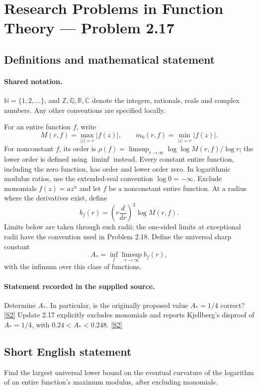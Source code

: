 \documentclass[11pt]{article}
\newcommand{\sref}[2]{\hyperlink{source:#1:#2}{[S#2]}}
\begin{document}
\section{Research Problems in Function Theory — Problem 2.17}\label{statement}

\subsection{Definitions and mathematical statement}

\paragraph{Shared notation.}$\mathbb N=\{1,2,\ldots\}$, and $\mathbb Z,\mathbb Q,\mathbb R,\mathbb C$ denote the integers, rationals, reals and complex numbers. Any other conventions are specified locally.


For an entire function $f$, write
\[
 M(r,f)=\max_{|z|=r}|f(z)|,\qquad m_0(r,f)=\min_{|z|=r}|f(z)|.
\]
For nonconstant $f$, its order is $\rho(f)=\limsup_{r\to\infty}\log\log M(r,f)/\log r$;
the lower order is defined using $\liminf$ instead. Every constant entire function, including the zero function, has order and lower order zero. In logarithmic modulus ratios, use the extended-real convention $\log0=-\infty$.
Exclude monomials $f(z)=az^n$ and let $f$ be a nonconstant entire function. At a radius where the derivatives exist, define
\[b_f(r)=\left(r\frac{d}{dr}\right)^2\log M(r,f).
\]
Limits below are taken through such radii; the one-sided limits at exceptional radii have the convention used in Problem 2.18.
Define the universal sharp constant
\[A_* = \inf_f\limsup_{r\to\infty}b_f(r),\]
with the infimum over this class of functions.

\paragraph{Statement recorded in the supplied source.}
Determine $A_*$. In particular, is the originally proposed value $A_*=1/4$ correct? \sref{statement}{2}
Update 2.17 explicitly excludes monomials and reports Kjellberg's disproof of $A_*=1/4$, with $0.24<A_*<0.248$. \sref{statement}{2}
\subsection{Short English statement}
Find the largest universal lower bound on the eventual curvature of the logarithm of an entire function's maximum modulus, after excluding monomials.
\end{document}
